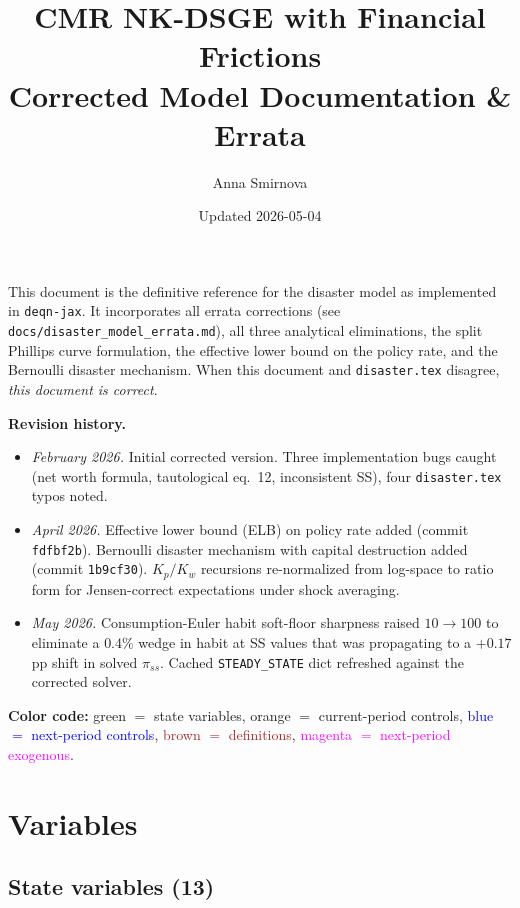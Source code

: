 \documentclass[11pt]{article}
\title{CMR NK-DSGE with Financial Frictions\\[4pt]
\large Corrected Model Documentation \& Errata}
\author{Anna Smirnova}
\date{Updated 2026-05-04}
\begin{document}
\maketitle

\noindent This document is the definitive reference for the disaster model as
implemented in \texttt{deqn-jax}. It incorporates all errata corrections
(see \texttt{docs/disaster\_model\_errata.md}), all three analytical
eliminations, the split Phillips curve formulation, the effective lower bound
on the policy rate, and the Bernoulli disaster mechanism. When this document
and \texttt{disaster.tex} disagree, \emph{this document is correct}.

\bigskip\noindent\textbf{Revision history.}
\begin{itemize}
\item \emph{February 2026.} Initial corrected version. Three implementation
  bugs caught (net worth formula, tautological eq.~12, inconsistent SS),
  four \texttt{disaster.tex} typos noted.
\item \emph{April 2026.} Effective lower bound (ELB) on policy rate added
  (commit \texttt{fdfbf2b}). Bernoulli disaster mechanism with capital
  destruction added (commit \texttt{1b9cf30}). $K_p/K_w$ recursions
  re-normalized from log-space to ratio form for Jensen-correct
  expectations under shock averaging.
\item \emph{May 2026.} Consumption-Euler habit soft-floor sharpness raised
  $10 \!\to\! 100$ to eliminate a $0.4\%$ wedge in habit at SS values that
  was propagating to a $+0.17$pp shift in solved $\pi_{ss}$. Cached
  \texttt{STEADY\_STATE} dict refreshed against the corrected solver.
\end{itemize}

\bigskip\noindent
\textbf{Color code:}
\textcolor{green!60!black}{green $=$ state variables},
\textcolor{orange!80!black}{orange $=$ current-period controls},
\textcolor{blue}{blue $=$ next-period controls},
\textcolor{brown}{brown $=$ definitions},
\textcolor{magenta}{magenta $=$ next-period exogenous}.


\section{Variables}

\subsection{State variables (13)}
\end{document}
